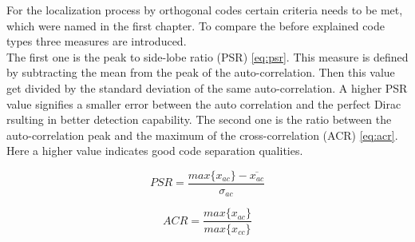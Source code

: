 For the localization process by orthogonal codes certain criteria needs to be met, which were named in the first chapter. To compare the before explained code types three measures are introduced. \\ 
The first one is the peak to side-lobe ratio (PSR) \ref{eq:psr}. This measure is defined by subtracting the mean from the peak of the auto-correlation. Then this value get divided by the standard deviation of the same auto-correlation. A higher PSR value signifies a smaller error between the auto correlation and the perfect Dirac rsulting in better detection capability. The second one is the ratio between the auto-correlation peak and the maximum of the cross-correlation (ACR) \ref{eq:acr}. Here a higher value indicates good code separation qualities. 

\begin{equation}
PSR=\dfrac{max\{x_{ac}\}-\overline{x_{ac}}}{\sigma_{ac}}
\label{eq:psr}
\end{equation}

\begin{equation}
ACR=\dfrac{max\{x_{ac}\}}{max\{{x_{cc}\}}}
\label{eq:acr}
\end{equation}

%
%
%
%
%

